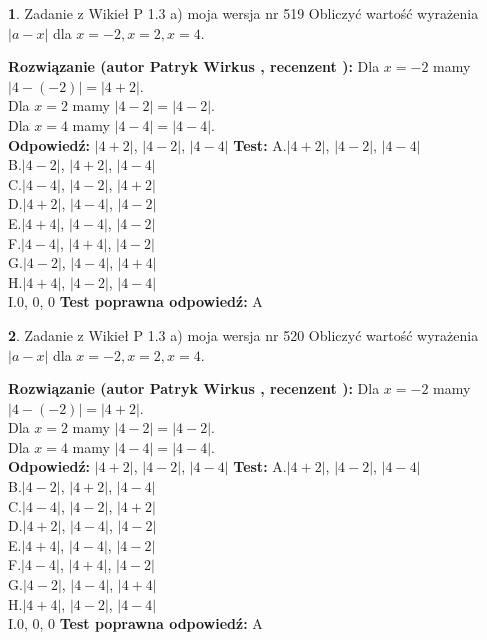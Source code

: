 \documentclass[12pt, a4paper]{article}
\theoremstyle{definition} %
\newtheorem{zad}{}
\newcommand{\zadStart}[1]{\begin{zad}#1\newline}
\newcommand{\zadStop}{\end{zad}}
\newcommand{\rozwStart}[2]{\noindent \textbf{Rozwiązanie (autor #1 , recenzent #2): }\newline}
\newcommand{\rozwStop}{\newline}
\newcommand{\odpStart}{\noindent \textbf{Odpowiedź:}\newline}
\newcommand{\odpStop}{\newline}
\newcommand{\testStart}{\noindent \textbf{Test:}\newline}
\newcommand{\testStop}{\newline}
\newcommand{\kluczStart}{\noindent \textbf{Test poprawna odpowiedź:}\newline}
\newcommand{\kluczStop}{\newline}
\begin{document}
\zadStart{Zadanie z Wikieł P 1.3 a) moja wersja nr 519}
Obliczyć wartość wyrażenia $|a - x|$ dla $x=-2,x=2,x=4$.
\zadStop
\rozwStart{Patryk Wirkus}{}
Dla $x = -2$ mamy $|4 - (-2)| = |4 + 2|$.\\
Dla $x = 2$ mamy $|4 - 2| = |4 - 2|$.\\
Dla $x = 4$ mamy $|4 - 4| = |4 - 4|$.\\
\rozwStop
\odpStart
$|4 + 2|$, $|4 - 2|$, $|4 - 4|$
\odpStop
\testStart
A.$|4 + 2|$, $|4 - 2|$, $|4 - 4|$\\
B.$|4 - 2|$, $|4 + 2|$, $|4 - 4|$\\
C.$|4 - 4|$, $|4 - 2|$, $|4 + 2|$\\
D.$|4 + 2|$, $|4 - 4|$, $|4 - 2|$\\
E.$|4 + 4|$, $|4 - 4|$, $|4 - 2|$\\
F.$|4 - 4|$, $|4 + 4|$, $|4 - 2|$\\
G.$|4 - 2|$, $|4 - 4|$, $|4 + 4|$\\
H.$|4 + 4|$, $|4 - 2|$, $|4 - 4|$\\
I.$0$, $0$, $0$
\testStop
\kluczStart
A
\kluczStop



\zadStart{Zadanie z Wikieł P 1.3 a) moja wersja nr 520}
Obliczyć wartość wyrażenia $|a - x|$ dla $x=-2,x=2,x=4$.
\zadStop
\rozwStart{Patryk Wirkus}{}
Dla $x = -2$ mamy $|4 - (-2)| = |4 + 2|$.\\
Dla $x = 2$ mamy $|4 - 2| = |4 - 2|$.\\
Dla $x = 4$ mamy $|4 - 4| = |4 - 4|$.\\
\rozwStop
\odpStart
$|4 + 2|$, $|4 - 2|$, $|4 - 4|$
\odpStop
\testStart
A.$|4 + 2|$, $|4 - 2|$, $|4 - 4|$\\
B.$|4 - 2|$, $|4 + 2|$, $|4 - 4|$\\
C.$|4 - 4|$, $|4 - 2|$, $|4 + 2|$\\
D.$|4 + 2|$, $|4 - 4|$, $|4 - 2|$\\
E.$|4 + 4|$, $|4 - 4|$, $|4 - 2|$\\
F.$|4 - 4|$, $|4 + 4|$, $|4 - 2|$\\
G.$|4 - 2|$, $|4 - 4|$, $|4 + 4|$\\
H.$|4 + 4|$, $|4 - 2|$, $|4 - 4|$\\
I.$0$, $0$, $0$
\testStop
\kluczStart
A
\kluczStop
\end{document}
